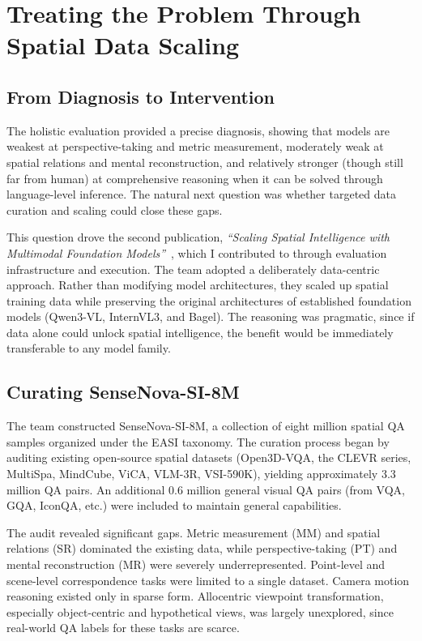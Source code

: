 \chapter{Treating the Problem Through Spatial Data Scaling}
\label{sec:treatment}

\section{From Diagnosis to Intervention}

The holistic evaluation provided a precise diagnosis, showing that models are weakest at perspective-taking and metric measurement, moderately weak at spatial relations and mental reconstruction, and relatively stronger (though still far from human) at comprehensive reasoning when it can be solved through language-level inference. The natural next question was whether targeted data curation and scaling could close these gaps.

This question drove the second publication, \textit{``Scaling Spatial Intelligence with Multimodal Foundation Models''}~\cite{cai2025scalingspatialintelligencemultimodal}, which I contributed to through evaluation infrastructure and execution. The team adopted a deliberately data-centric approach. Rather than modifying model architectures, they scaled up spatial training data while preserving the original architectures of established foundation models (Qwen3-VL, InternVL3, and Bagel). The reasoning was pragmatic, since if data alone could unlock spatial intelligence, the benefit would be immediately transferable to any model family.

\section{Curating SenseNova-SI-8M}

The team constructed SenseNova-SI-8M, a collection of eight million spatial QA samples organized under the EASI taxonomy. The curation process began by auditing existing open-source spatial datasets (Open3D-VQA, the CLEVR series, MultiSpa, MindCube, ViCA, VLM-3R, VSI-590K), yielding approximately 3.3 million QA pairs. An additional 0.6 million general visual QA pairs (from VQA, GQA, IconQA, etc.) were included to maintain general capabilities.

The audit revealed significant gaps. Metric measurement (MM) and spatial relations (SR) dominated the existing data, while perspective-taking (PT) and mental reconstruction (MR) were severely underrepresented. Point-level and scene-level correspondence tasks were limited to a single dataset. Camera motion reasoning existed only in sparse form. Allocentric viewpoint transformation, especially object-centric and hypothetical views, was largely unexplored, since real-world QA labels for these tasks are scarce.

